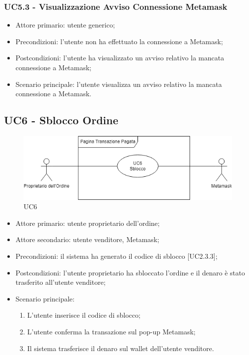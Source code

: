 \subsubsection{UC5.3 - Visualizzazione Avviso Connessione Metamask}

\begin{itemize}
    \item Attore primario: utente generico;
    \item Precondizioni: l'utente non ha effettuato la connessione a Metamask\glo{};
    \item Postcondizioni: l'utente ha visualizzato un avviso relativo la mancata connessione a Metamask\glo{};
    \item Scenario principale: l'utente visualizza un avviso relativo la mancata connessione a Metamask\glo{}.
\end{itemize}

\subsection{UC6 - Sblocco Ordine}

\begin{figure}[H]
    \centering
    \includegraphics[scale=0.7]{immagini/UC6.png}
    \caption{UC6}
\end{figure}

\begin{itemize}
    \item Attore primario: utente proprietario dell'ordine;
    \item Attore secondario: utente venditore, Metamask\glo{};
    \item Precondizioni: il sistema ha generato il codice di sblocco [UC2.3.3];
    \item Postcondizioni: l'utente proprietario ha sbloccato l'ordine e il denaro è stato trasferito all'utente venditore;
    \item Scenario principale:
          \begin{enumerate}
              \item L'utente inserisce il codice di sblocco;
              \item L'utente conferma la transazione sul pop-up Metamask\glo{};
              \item Il sistema trasferisce il denaro sul wallet\glo{} dell'utente venditore.
          \end{enumerate}
\end{itemize}

